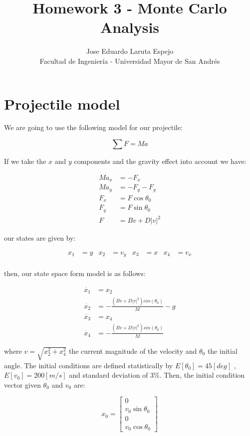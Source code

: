 \documentclass[12pt,letterpaper]{article}
\title{Homework 3 - Monte Carlo Analysis}
\author{Jose Eduardo Laruta Espejo \\ Facultad de Ingeniería - Universidad Mayor de San Andrés}
\begin{document}
\maketitle

\section{Projectile model}
We are going to use the following model for our projectile:

\begin{equation}
    \sum{F} = M a
\end{equation}

If we take the $x$ and $y$ components and the gravity effect into account we have:

\begin{align}
    M a_x &= -F_x \\ 
    M a_y &= -F_y - F_g \\ 
    F_x &= F\cos{\theta_0} \\
    F_y &= F\sin{\theta_0} \\
    F &= Bv + D|v|^2
\end{align}

our states are given by:

\begin{align*}
    x_1 &= y &x_2&=v_y &x_3&=x &x_4&=v_x\\
\end{align*}

then, our state space form model is as follows:

\begin{align}
    \dot{x_1} &= x_2 \\
    \dot{x_2} &= -\frac{(Bv + D|v|^2)cos(\theta_0)}{M} - g \\
    \dot{x_3} &= x_4 \\
    \dot{x_4} &= -\frac{(Bv + D|v|^2)sin(\theta_0)}{M}
\end{align}

where $v = \sqrt{x_2^2 + x_4^2}$ the current magnitude of the velocity and $\theta_0$ the initial angle. The initial conditions are 
defined statistically by $E[\theta_0] = 45[deg]$ , $E[v_0]=200[m/s]$ and standard deviation of 3\%. Then, the initial condition vector 
given $\theta_0$ and $v_0$ are:

\begin{equation*}
    x_0 = \begin{bmatrix}
        0 \\
        v_0 \sin{\theta_0} \\
        0 \\
        v_0 \cos{\theta_0}
    \end{bmatrix}
\end{equation*}
\end{document}
